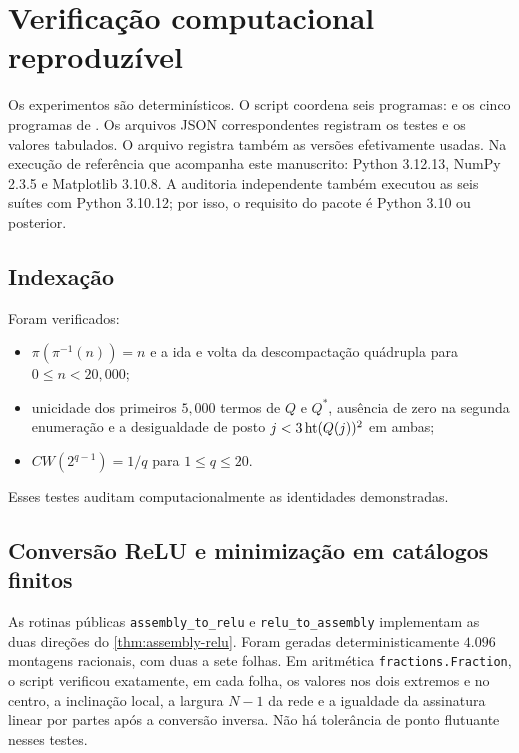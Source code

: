 \section{Verificação computacional reproduzível}
\label{sec:verification}

Os experimentos são determinísticos. O script  coordena seis
programas:  e os cinco programas de
. Os arquivos JSON correspondentes registram os
testes e os valores tabulados. O arquivo
 registra também as versões
efetivamente usadas. Na execução de referência que acompanha este manuscrito:
Python 3.12.13, NumPy 2.3.5 e Matplotlib 3.10.8. A auditoria independente
também executou as seis suítes com Python 3.10.12; por isso, o requisito do
pacote é Python 3.10 ou posterior.

\subsection{Indexação}

Foram verificados:
\begin{itemize}[leftmargin=1.6em]
 \item $\pi(\pi^{-1}(n))=n$ e a ida e volta da descompactação quádrupla para $0\le n<20,000$;
 \item unicidade dos primeiros $5,000$ termos de $Q$ e $Q^{\!*}$, ausência de zero na segunda enumeração e a desigualdade de posto $j<3\operatorname{ht}(Q(j))^2$ em ambas;
 \item $CW(2^{q-1})=1/q$ para $1\le q\le20$.
\end{itemize}
Esses testes auditam computacionalmente as identidades demonstradas.

\subsection{Conversão ReLU e minimização em catálogos finitos}

As rotinas públicas \texttt{assembly\_to\_relu} e
\texttt{relu\_to\_assembly} implementam as duas direções do
\cref{thm:assembly-relu}. Foram geradas deterministicamente $4.096$ montagens
racionais, com duas a sete folhas. Em aritmética
\texttt{fractions.\allowbreak Fraction}, o script verificou exatamente, em cada folha, os
valores nos dois extremos e no centro, a inclinação local, a largura
$N-1$ da rede e a igualdade da assinatura linear por partes após a conversão
inversa. Não há tolerância de ponto flutuante nesses testes.

